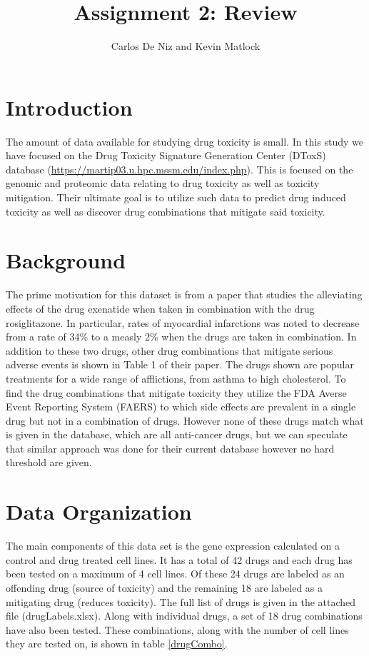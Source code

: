 \documentclass[]{article}
\title{Assignment 2: Review}
\author{Carlos De Niz and Kevin Matlock}
\begin{document}
\date{}
\maketitle

\section{Introduction}
The amount of data available for studying drug toxicity is small. In this study we have focused on the Drug Toxicity Signature Generation Center (DToxS) database (\url{https://martip03.u.hpc.mssm.edu/index.php}).
This  is focused on the genomic and proteomic data relating to drug toxicity as well as toxicity mitigation. Their ultimate goal is to utilize such data to predict drug induced toxicity as well as discover drug combinations that mitigate said toxicity.

\section{Background}
The prime motivation for this dataset is from a paper that studies the alleviating effects of the drug exenatide when taken in combination with the drug rosiglitazone\cite{zhao_2013}. 
In particular, rates of myocardial infarctions was noted to decrease from a rate of 34\% to a measly 2\% when the drugs are taken in combination.
In addition to these two drugs, other drug combinations that mitigate serious adverse events is shown in Table 1 of their paper\cite{zhao_2013}. The drugs shown are popular treatments for a wide range of afflictions, from asthma to high cholesterol. 
To find the drug combinations that mitigate toxicity they utilize the FDA Averse Event Reporting System (FAERS) to which side effects are prevalent in a single drug but not in a combination of drugs.
However none of these drugs match what is given in the database, which are all anti-cancer drugs, but we can speculate that similar approach was done for their current database however no hard threshold are given.

\section{Data Organization}

The main components of this data set is the gene expression calculated on a control and drug treated cell lines. It has a total of 42 drugs and each drug has been tested on a maximum of 4 cell lines.
Of these 24 drugs are labeled as an offending drug (source of toxicity) and the remaining 18 are labeled as a mitigating drug (reduces toxicity). The full list of drugs is given in the attached file (drugLabels.xlsx).
Along with individual drugs, a set of 18 drug combinations have also been tested. These combinations, along with the number of cell lines they are tested on, is shown in table \ref{drugCombo}.
\end{document}
